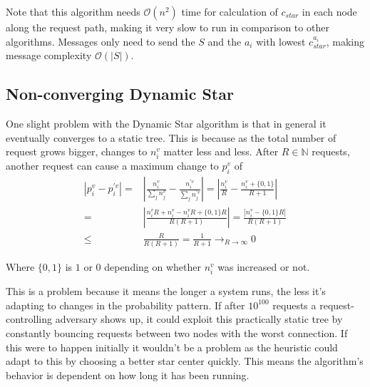 \documentclass[a4paper, oneside]{discothesis}
\begin{document}
Note that this algorithm needs $\mathcal{O}(n^2)$ time for calculation of $c_{star}$ in each node along the request path, making it very slow to run in comparison to other algorithms. Messages only need to send the $S$ and the $a_i$ with lowest $c_{star}^{a_i}$, making message complexity $\mathcal{O}(|S|)$.

\subsection{Non-converging Dynamic Star}

One slight problem with the Dynamic Star algorithm is that in general it eventually converges to a static tree. This is because as the total number of request grows bigger, changes to $n_i^v$ matter less and less. After $R\in\mathbb{N}$ requests, another request can cause a maximum change to $p_i^v$ of
\begin{equation}
\begin{split}
\left|p_i^v-p_i^{'v}\right| = & \left|\frac{n_i^v}{\sum_jn_j^v}-\frac{n_i^{'v}}{\sum_jn_j^{'v}}\right| = \left|\frac{n_i^v}{R}-\frac{n_i^v+\{0,1\}}{R+1}\right| \\
= & \left|\frac{n_i^vR+n_i^v-n_i^vR+\{0,1\}R}{R(R+1)}\right| = \frac{\left|n_i^v-\{0,1\}R\right|}{R(R+1)} \\
\leq & \frac{R}{R(R+1)}=\frac{1}{R+1}\to_{R\to\infty} 0
\end{split}
\end{equation}

Where $\{0,1\}$ is $1$ or $0$ depending on whether $n_i^v$ was increased or not.

This is a problem because it means the longer a system runs, the less it's adapting to changes in the probability pattern. If after $10^{100}$ requests a request-controlling adversary shows up, it could exploit this practically static tree by constantly bouncing requests between two nodes with the worst connection. If this were to happen initially it wouldn't be a problem as the heuristic could adapt to this by choosing a better star center quickly. This means the algorithm's behavior is dependent on how long it has been running.
\end{document}
